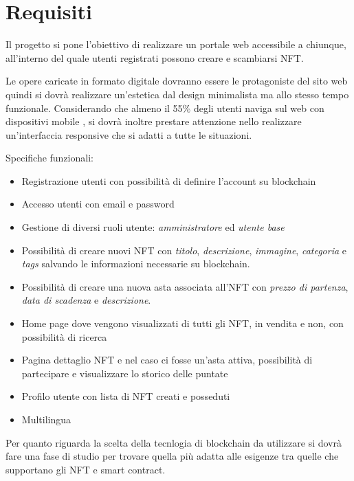 \section{Requisiti}
Il progetto si pone l'obiettivo di realizzare un portale web accessibile a chiunque, 
all'interno del quale utenti registrati possono creare e scambiarsi NFT.

Le opere caricate in formato digitale dovranno essere le protagoniste del sito web
quindi si dovrà realizzare un'estetica dal design minimalista ma allo stesso tempo funzionale.
Considerando che almeno il 55\% degli utenti naviga sul web con dispositivi mobile \cite{require1}, 
si dovrà inoltre prestare attenzione nello realizzare un'interfaccia responsive che si adatti a tutte le situazioni. 

Specifiche funzionali:
\begin{itemize}
	\item Registrazione utenti con possibilità di definire l'account su blockchain
	\item Accesso utenti con email e password
	\item Gestione di diversi ruoli utente: \textit{amministratore} ed \textit{utente base}
	\item Possibilità di creare nuovi NFT con \textit{titolo}, \textit{descrizione}, \textit{immagine}, \textit{categoria} e \textit{tags} salvando le informazioni necessarie su blockchain.
	\item Possibilità di creare una nuova asta associata all'NFT con \textit{prezzo di partenza}, \textit{data di scadenza} e \textit{descrizione}.
	\item Home page dove vengono visualizzati di tutti gli NFT, in vendita e non, con possibilità di ricerca
	\item Pagina dettaglio NFT e nel caso ci fosse un'asta attiva, possibilità di partecipare e visualizzare lo storico delle puntate 
	\item Profilo utente con lista di NFT creati e posseduti
	\item Multilingua
\end{itemize}

Per quanto riguarda la scelta della tecnlogia di blockchain da utilizzare 
si dovrà fare una fase di studio per trovare quella più adatta alle esigenze 
tra quelle che supportano gli NFT e smart contract. 
